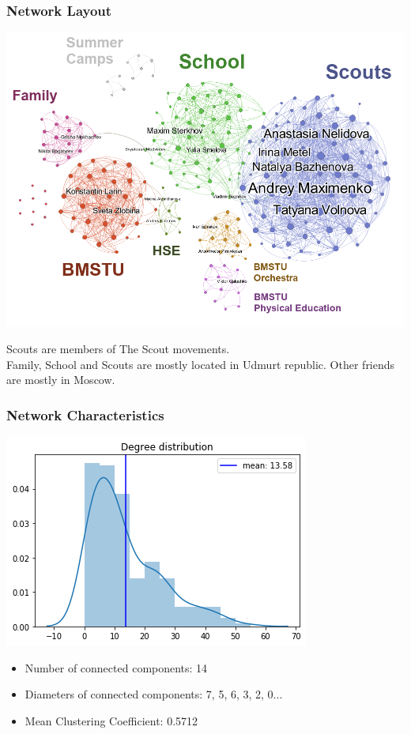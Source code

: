 \documentclass{beamer}
\begin{document}
\begin{frame}
\frametitle{Network Layout}
\begin{multicols}{2}
	\includegraphics[width=\columnwidth]{Network_with_labels.png}
	\columnbreak

	Scouts are members of The Scout movements.\\
	\medskip
		Family, School and Scouts are mostly located in Udmurt republic. Other friends are mostly in Moscow.

\end{multicols}

\end{frame}

\begin{frame}
\frametitle{Network Characteristics}
\begin{multicols}{2}
	\includegraphics[width=\columnwidth]{Degree_distribution.png}
	\columnbreak

	\begin{itemize}
	\item Number of connected components: 14
	\item Diameters of connected components: 7, 5, 6, 3, 2, 0...
	\item Mean Clustering Coefficient: 0.5712
	\end{itemize}
\end{multicols}

\end{frame}
\end{document}
